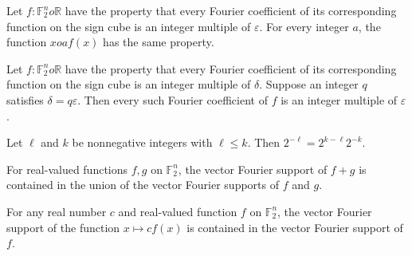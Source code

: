 \begin{theorem}
\label{FABL.IsVectorFourierGranular.intCast_mul}
\leanok
{}
Let $f:\mathbb{F}_2^n	o\mathbb{R}$ have the property that every Fourier coefficient of its corresponding
function on the sign cube is an integer multiple of $\varepsilon$. For every integer
$a$, the function $x	o a f(x)$ has the same property.
\end{theorem}

\begin{theorem}
\label{FABL.IsVectorFourierGranular.refine}
\leanok
{}
Let $f:\mathbb{F}_2^n	o\mathbb{R}$ have the property that every Fourier coefficient of its corresponding
function on the sign cube is an integer multiple of $\delta$. Suppose an integer $q$
satisfies $\delta=q\varepsilon$. Then every such Fourier coefficient of $f$ is an
integer multiple of $\varepsilon$.
\end{theorem}

\begin{theorem}
\label{FABL.inverse_two_pow_eq_natCast_mul_inverse_two_pow}
\leanok
{}
Let $\ell$ and $k$ be nonnegative integers with $\ell\le k$. Then
$2^{-\ell}=2^{k-\ell}2^{-k}$.
\end{theorem}

\begin{theorem}
\label{FABL.vectorFourierSupport_add_subset}
\leanok
{}
For real-valued functions $f,g$ on $\mathbb{F}_2^n$, the vector Fourier support of $f+g$
is contained in the union of the vector Fourier supports of $f$ and $g$.
\end{theorem}

\begin{theorem}
\label{FABL.vectorFourierSupport_const_mul_subset}
\leanok
{}
For any real number $c$ and real-valued function $f$ on $\mathbb{F}_2^n$, the vector
Fourier support of the function $x\mapsto c f(x)$ is contained in the vector Fourier
support of $f$.
\end{theorem}

